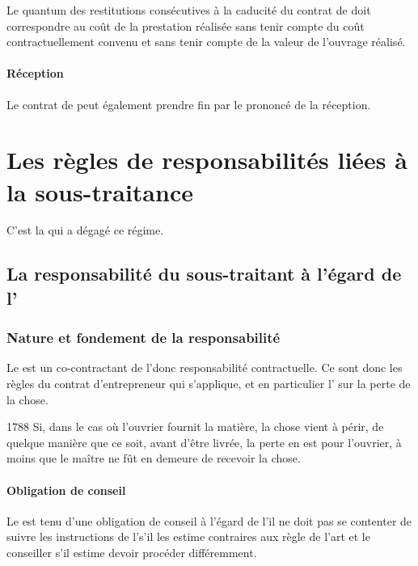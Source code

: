 	Le quantum des restitutions consécutives à la caducité du contrat de \ST doit correspondre au coût de la prestation réalisée sans tenir compte du coût contractuellement convenu et sans tenir compte de la valeur de l’ouvrage réalisé.


	\paragraph{Réception} Le contrat de \ST* peut également prendre fin par le prononcé de la réception.



\section{Les règles de responsabilités liées à la sous-traitance}

	C’est la \JP qui a dégagé ce régime.

	\subsection{La responsabilité du sous-traitant à l'égard de l'\ep}

		\subsubsection{Nature et fondement de la responsabilité}

			Le \ST est un co-contractant de l’\ep donc responsabilité contractuelle.
Ce sont donc les règles du contrat d'entrepreneur qui s'applique, et en particulier l' sur la perte de la chose.

			\begin{citationArticle}{1788}{\cciv}
				Si, dans le cas où l'ouvrier fournit la matière, la chose vient à périr, de quelque manière que ce soit, avant d'être livrée, la perte en est pour l'ouvrier, à moins que le maître ne fût en demeure de recevoir la chose.
			\end{citationArticle}

			\paragraph{Obligation de conseil} Le \ST est tenu d’une obligation de conseil à l’égard de l’\ep il ne doit pas se contenter de suivre les instructions de l’\ep s’il les estime contraires aux règle de l’art et le conseiller s’il estime devoir procéder différemment.


